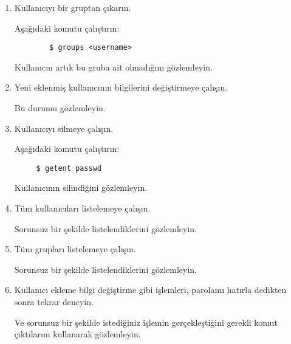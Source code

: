 \documentclass[a4paper,10pt]{article}
\begin{document}
\begin{enumerate}
\item Kullanıcıyı bir gruptan çıkarın.

       Aşağıdaki komutu çalıştırın:
    \begin{verbatim}
        $ groups <username> 
    \end{verbatim}
        Kullanıcın artık bu gruba ait olmadığını gözlemleyin.

\item Yeni eklenmiş kullanıcının bilgilerini değiştirmeye çalışın.

Bu durumu gözlemleyin.
\item Kullanıcıyı silmeye çalışın.

      Aşağıdaki komutu çalıştırın:
\begin{verbatim}
     $ getent passwd
\end{verbatim}
     Kullanıcının silindiğini gözlemleyin.

\item Tüm kullanıcıları listelemeye çalışın.

Sorunsuz bir şekilde listelendiklerini gözlemleyin.
\item Tüm grupları listelemeye çalışın.

Sorunsuz bir şekilde listelendiklerini gözlemleyin.
\item Kullanıcı ekleme bilgi değiştirme gibi işlemleri, parolamı hatırla dedikten sonra tekrar deneyin.

Ve sorunsuz bir şekilde istediğiniz işlemin gerçekleştiğini gerekli komut çıktılarını kullanarak gözlemleyin.

\end{enumerate}
\end{document}
